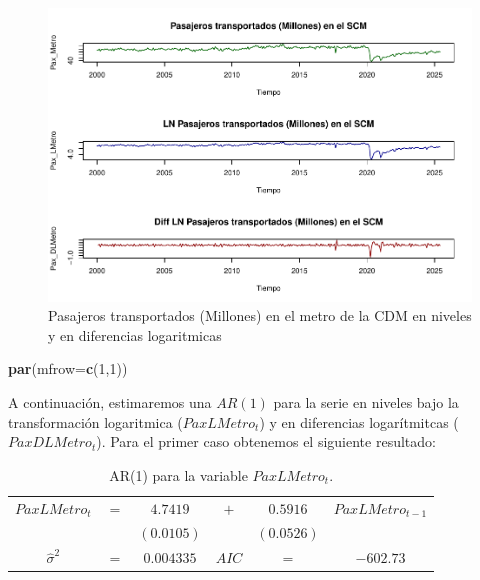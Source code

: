 \documentclass[
]{book}
\newenvironment{Shaded}{\begin{snugshade}}{\end{snugshade}}
\newcommand{\AttributeTok}[1]{\textcolor[rgb]{0.13,0.29,0.53}{#1}}
\newcommand{\DecValTok}[1]{\textcolor[rgb]{0.00,0.00,0.81}{#1}}
\newcommand{\FunctionTok}[1]{\textcolor[rgb]{0.13,0.29,0.53}{\textbf{#1}}}
\newcommand{\NormalTok}[1]{#1}
\begin{document}
\begin{figure}

{\centering \includegraphics{Notas-Series-Tiempo_files/figure-latex/fig46-1} 

}

\caption{Pasajeros transportados (Millones) en el metro de la CDM en niveles y en diferencias logaritmicas}\label{fig:fig46}
\end{figure}

\begin{Shaded}
\begin{Highlighting}[]
\FunctionTok{par}\NormalTok{(}\AttributeTok{mfrow=}\FunctionTok{c}\NormalTok{(}\DecValTok{1}\NormalTok{,}\DecValTok{1}\NormalTok{))}
\end{Highlighting}
\end{Shaded}

A continuación, estimaremos una \(AR(1)\) para la serie en niveles bajo la transformación logaritmica (\(PaxLMetro_t\)) y en diferencias logarítmitcas (\(PaxDLMetro_t\)). Para el primer caso obtenemos el siguiente resultado:

\begin{longtable}[]{@{}cccccc@{}}
\caption{\label{tab:AR01} AR(1) para la variable \(PaxLMetro_t\).}\tabularnewline
\toprule\noalign{}
\endfirsthead
\endhead
\bottomrule\noalign{}
\endlastfoot
\(PaxLMetro_t\) & \(=\) & \(4.7419\) & \(+\) & \(0.5916\) & \(PaxLMetro_{t-1}\) \\
& & \((0.0105)\) & & \((0.0526)\) & \\
\(\hat{\sigma}^2\) & \(=\) & \(0.004335\) & \(AIC\) & \(=\) & \(-602.73\) \\
\end{longtable}
\end{document}
